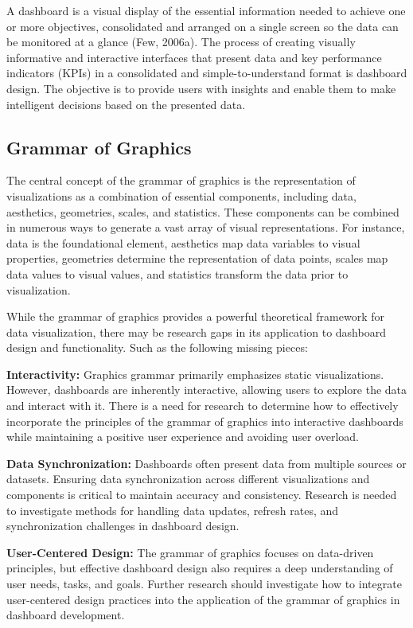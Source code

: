 \documentclass[print]{nuthesis}
\begin{document}
A dashboard is a visual display of the essential information needed to achieve one or more objectives, consolidated and arranged on a single screen so the data can be monitored at a glance (Few, 2006a).
The process of creating visually informative and interactive interfaces that present data and key performance indicators (KPIs) in a consolidated and simple-to-understand format is dashboard design.
The objective is to provide users with insights and enable them to make intelligent decisions based on the presented data.

\hypertarget{grammar-of-graphics}{%
\subsection{Grammar of Graphics}\label{grammar-of-graphics}}

The central concept of the grammar of graphics is the representation of visualizations as a combination of essential components, including data, aesthetics, geometries, scales, and statistics.
These components can be combined in numerous ways to generate a vast array of visual representations.
For instance, data is the foundational element, aesthetics map data variables to visual properties, geometries determine the representation of data points, scales map data values to visual values, and statistics transform the data prior to visualization.

While the grammar of graphics provides a powerful theoretical framework for data visualization, there may be research gaps in its application to dashboard design and functionality.
Such as the following missing pieces:

\textbf{Interactivity:}
Graphics grammar primarily emphasizes static visualizations.
However, dashboards are inherently interactive, allowing users to explore the data and interact with it.
There is a need for research to determine how to effectively incorporate the principles of the grammar of graphics into interactive dashboards while maintaining a positive user experience and avoiding user overload.

\textbf{Data Synchronization:}
Dashboards often present data from multiple sources or datasets.
Ensuring data synchronization across different visualizations and components is critical to maintain accuracy and consistency.
Research is needed to investigate methods for handling data updates, refresh rates, and synchronization challenges in dashboard design.

\textbf{User-Centered Design:}
The grammar of graphics focuses on data-driven principles, but effective dashboard design also requires a deep understanding of user needs, tasks, and goals.
Further research should investigate how to integrate user-centered design practices into the application of the grammar of graphics in dashboard development.
\end{document}

